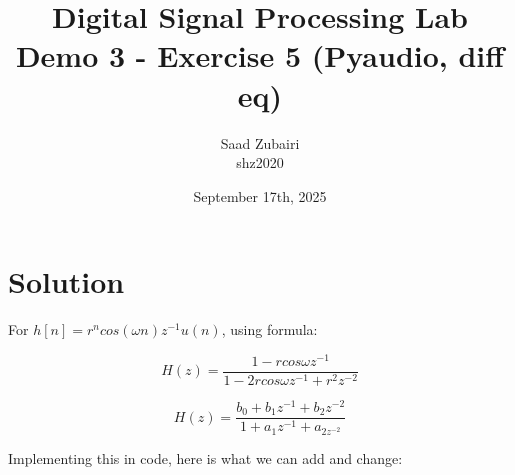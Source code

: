 \documentclass[11pt]{article}
\title{
    \vspace{3em}
    \textbf{Digital Signal Processing Lab}\\
    Demo 3 - Exercise 5 (Pyaudio, diff eq)
    \vspace{1em}
}
\author{
    Saad Zubairi \\ 
    shz2020 \\
    \vspace{1em}
}
\date{September 17th, 2025}
\begin{document}
\maketitle	

\pagebreak



\section*{Solution}

For $h[n] = r^{n}cos(\omega n)z^{-1}u(n)$, using formula:

\begin{center}
    $$
    H(z) = \frac{1-rcos\omega z^{-1}}{1-2rcos\omega z^{-1} + r^{2}z^{-2}}
    $$
\end{center}

\begin{center}
    $$
    H(z) = \frac{b_{0}+b_{1}z^{-1}+b_{2}z^{-2}}{1 + a_{1}z^{-1} + a_{2z^{-2}}}
    $$
\end{center}


Implementing this in code, here is what we can add and change:
\end{document}
